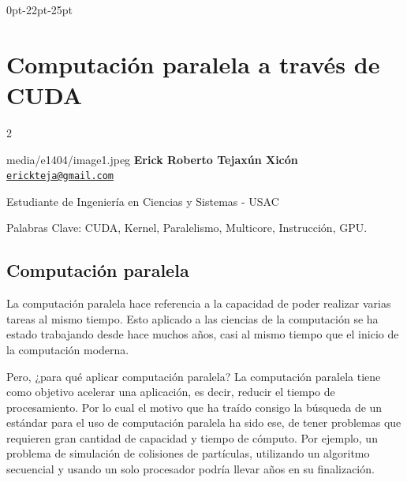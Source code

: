 \documentclass[12pt,spanish,Letterpaper,openany]{book}
\newcommand{\formatsection}{\fontspec{Open Sans Condensed}[SizeFeatures={Size=16},Color=black,LetterSpace=-1.5]}
\newcommand{\labelsection}{\empty}
\newcommand{\sepsection}{0.0em}
\newcommand{\beforecodesection}{\bfseries\selectfont}
\newcommand{\leftchapter}{0pt}
\newcommand{\beforesepchapter}{-22pt}
\newcommand{\afterchapter}{-25pt}
\let\BeginKnitrBlock\begin \let\EndKnitrBlock\end
\begin{document}
\titlespacing*{\chapter} {\leftchapter}{\beforesepchapter}{\afterchapter}

\titleformat{\section}[block]{\formatsection}{\labelsection}{\sepsection}{\beforecodesection#1}

\hypertarget{article04}{%
\chapter{Computación paralela a través de CUDA}\label{article04}}

\begin {multicols}{2}

\BeginKnitrBlock{photobiography3}{media/e1404/image1.jpeg}
\textbf{Erick Roberto Tejaxún Xicón}\\
\href{mailto:erickteja@gmail.com}{\nolinkurl{erickteja@gmail.com}}

\medskip

Estudiante de Ingeniería en Ciencias y Sistemas - USAC\\

\medskip

Palabras Clave: CUDA, Kernel, Paralelismo, Multicore, Instrucción, GPU.
\EndKnitrBlock{photobiography3}

\hypertarget{computaciuxf3n-paralela}{%
\section{Computación paralela}\label{computaciuxf3n-paralela}}

La computación paralela hace referencia a la capacidad de poder realizar varias tareas al mismo tiempo. Esto aplicado a las ciencias de la computación se ha estado trabajando desde hace muchos años, casi al mismo tiempo que el inicio de la computación moderna.

Pero, ¿para qué aplicar computación paralela? La computación paralela tiene como objetivo acelerar una aplicación, es decir, reducir el tiempo de procesamiento. Por lo cual el motivo que ha traído consigo la búsqueda de un estándar para el uso de computación paralela ha sido ese, de tener problemas que requieren gran cantidad de capacidad y tiempo de cómputo. Por ejemplo, un problema de simulación de colisiones de partículas, utilizando un algoritmo secuencial y usando un solo procesador podría llevar años en su finalización.


\end{multicols}
\end{document}
